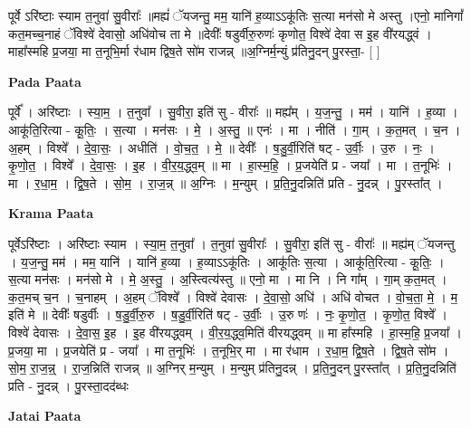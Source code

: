 \documentclass[17pt]{extarticle}
\begin{document}
पूर्वे ऽरि॑ष्टाः स्याम त॒नुवा॑ सु॒वीराः᳚ ॥मह्यं॑ ॅयजन्तु॒ मम॒ यानि॑ ह॒व्याऽऽकू॑तिः स॒त्या मन॑सो मे अस्तु ।एनो॒ मानिगां᳚ कत॒मच्च॒नाहं ॅविश्वे॑ देवासो॒ अधि॑वोच ता मे ॥देवीः᳚ षडुर्वीरु॒रुणः॑ कृणोत॒ विश्वे॑ देवा स इ॒ह वी॑रयद्ध्वं ।माहा᳚स्महि प्र॒जया॒ मा त॒नूभि॒र्मा र॑धाम द्विष॒ते सो॑म राजन्न् ॥अ॒ग्निर्म॒न्युं प्र॑तिनु॒दन् पु॒रस्ता॒- [  ] \newline

\textbf{Pada Paata} \newline

पूर्वे᳚ । अरि॑ष्टाः । स्या॒म॒ । त॒नुवा᳚ । सु॒वीरा॒ इति॑ सु - वीराः᳚ ॥ मह्य᳚म् । य॒ज॒न्तु॒ । मम॑ । यानि॑ । ह॒व्या । आकू॑ति॒रित्या - कू॒तिः॒ । स॒त्या । मन॑सः । मे॒ । अ॒स्तु॒ ॥ एनः॑ । मा । नीति॑ । गा॒म् । क॒त॒मत् । च॒न । अ॒हम् । विश्वे᳚ । दे॒वा॒सः॒ । अधीति॑ । वो॒च॒त॒ । मे॒ ॥ देवीः᳚ । ष॒डु॒र्वी॒रिति॑ षट् - उ॒र्वीः॒ । उ॒रु । नः॒ । कृ॒णो॒त॒ । विश्वे᳚ । दे॒वा॒सः॒ । इ॒ह । वी॒र॒य॒द्ध्व॒म् ॥ मा । हा॒स्म॒हि॒ । प्र॒जयेति॑ प्र - जया᳚ । मा । त॒नूभिः॑ । मा । र॒धा॒म॒ । द्वि॒ष॒ते । सो॒म॒ । रा॒ज॒न्न् ॥ अ॒ग्निः । म॒न्युम् । प्र॒ति॒नु॒दन्निति॑ प्रति - नु॒दन्न् । पु॒रस्ता᳚त् ।  \newline


\textbf{Krama Paata} \newline

पूर्वेऽरि॑ष्टाः । अरि॑ष्टाः स्याम । स्या॒म॒ त॒नुवा᳚ । त॒नुवा॑ सु॒वीराः᳚ । सु॒वीरा॒ इति॑ सु - वीराः᳚ ॥ मह्य॑म् ॅयजन्तु । य॒ज॒न्तु॒ मम॑ । मम॒ यानि॑ । यानि॑ ह॒व्या । ह॒व्याऽऽकू॑तिः । आकू॑तिः स॒त्या । आकू॑ति॒रित्या - कू॒तिः॒ । स॒त्या मन॑सः । मन॑सो मे । मे॒ अ॒स्तु॒ । अ॒स्त्वित्य॑स्तु ॥ एनो॒ मा । मा नि । नि गा᳚म् । गा॒म् क॒त॒मत् । क॒त॒मच् च॒न । च॒नाहम् । अ॒हम् ॅविश्वे᳚ । विश्वे॑ देवासः । दे॒वा॒सो॒ अधि॑ । अधि॑ वोचत । वो॒च॒ता॒ मे॒ । म॒ इति॑ मे ॥ देवीः᳚ षडुर्वीः । ष॒डु॒र्वी॒रु॒रु । ष॒डु॒र्वी॒रिति॑ षट् - उ॒र्वीः॒ । उ॒रु णः॑ । नः॒ कृ॒णो॒त॒ । कृ॒णो॒त॒ विश्वे᳚ । विश्वे॑ देवासः । दे॒वा॒स॒ इ॒ह । इ॒ह वी॑रयद्ध्वम् । वी॒र॒य॒द्ध्व॒मिति॑ वीरयद्ध्वम् ॥ मा हा᳚स्महि । हा॒स्म॒हि॒ प्र॒जया᳚ । प्र॒जया॒ मा । प्र॒जयेति॑ प्र - जया᳚ । मा त॒नूभिः॑ । त॒नूभि॒र् मा । मा र॑धाम । र॒धा॒म॒ द्वि॒ष॒ते । द्वि॒ष॒ते सो॑म । सो॒म॒ रा॒ज॒न्न्॒ । रा॒ज॒न्निति॑ राजन्न् ॥ अ॒ग्निर् म॒न्युम् । म॒न्युम् प्र॑तिनु॒दन्न् । प्र॒ति॒नु॒दन् पु॒रस्ता᳚त् । प्र॒ति॒नु॒दन्निति॑ प्रति - नु॒दन्न् । पु॒रस्ता॒दद॑ब्धः \newline

\textbf{Jatai Paata} \newline
\end{document}
